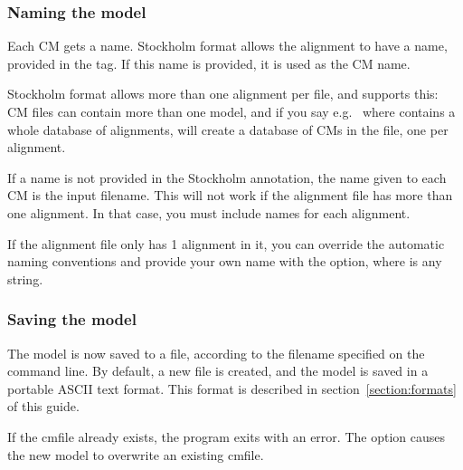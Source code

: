 \subsubsection{Naming the model}

Each CM gets a name. Stockholm format allows the alignment to have a
name, provided in the  tag. If this name is provided,
it is used as the CM name.

Stockholm format allows more than one alignment per file, and
 supports this: CM files can contain more than one
model, and if you say e.g.\  where
 contains a whole database of alignments,
 will create a database of CMs in the  file,
one per alignment. 

If a name is not provided in the Stockholm 
annotation, the name given to each CM is the input filename. This will
not work if the alignment file has more than one alignment. In that
case, you must include names for each alignment.

If the alignment file only has 1 alignment in it, you can override the
automatic naming conventions and provide your own name with the 
option, where  is any string. 

\subsubsection{Saving the model}

The model is now saved to a file, according to the filename specified
on the command line. By default, a new file is created, and the model
is saved in a portable ASCII text format. This format is described in
section~\ref{section:formats} of this guide.

If the cmfile already exists, the program exits with an error. The
 option causes the new model to overwrite an existing
cmfile. 


